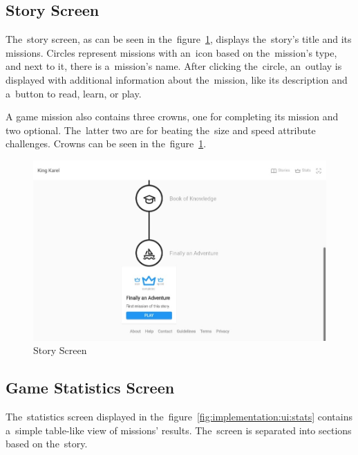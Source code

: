 \subsection{Story Screen}

The~story screen, as can be seen in the~figure~\ref{fig:implementation:ui:story}, displays the~story's title and its missions.
Circles represent missions with an~icon based on the~mission's type, and next to it, there is a~mission's name.
After clicking the~circle, an~outlay is displayed with additional information about the~mission, like its description and a~button to read, learn, or play.

A game mission also contains three crowns, one for completing its mission and two optional.
The~latter two are for beating the~size and speed attribute challenges.
Crowns can be seen in the~figure~\ref{fig:implementation:ui:story}.

\begin{figure}
    \centering
    \includegraphics[width=1\linewidth]{assets/implementation/ui/kingkarel_story_game_mission.jpeg}
    \caption{Story Screen}
    \label{fig:implementation:ui:story}
\end{figure}

\subsection{Game Statistics Screen}

The~statistics screen displayed in the~figure~\ref{fig:implementation:ui:stats} contains a~simple table-like view of missions' results.
The~screen is separated into sections based on the~story.

